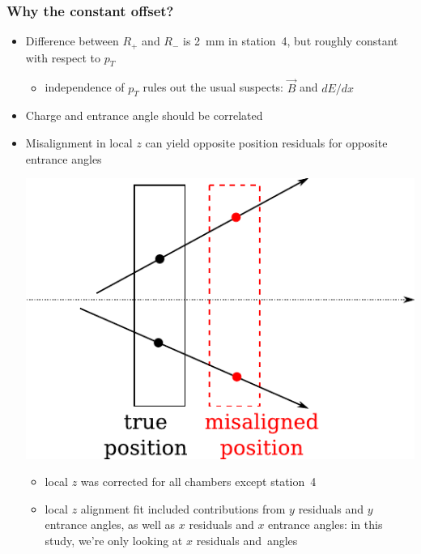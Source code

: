 \documentclass[compress]{beamer}
\begin{document}
\begin{frame}
\frametitle{Why the constant offset?}

\begin{itemize}
\item Difference between $R_+$ and $R_-$ is 2~mm in station~4, but
  roughly constant with respect to $p_T$
\begin{itemize}
\item independence of $p_T$ rules out the usual suspects: $\vec{B}$ and $dE/dx$
\end{itemize}
\item Charge and entrance angle should be correlated
\item Misalignment in local $z$ can yield opposite position residuals for opposite entrance angles

\begin{center}
\includegraphics[width=0.35\linewidth]{misalignment_in_z.pdf}
\end{center}

\begin{itemize}
\item local $z$ was corrected for all chambers except station~4
\item local $z$ alignment fit included contributions from $y$ residuals and $y$ entrance angles, as well as $x$ residuals and $x$ entrance angles: in this study, we're only looking at $x$ residuals \mbox{and angles\hspace{-1 cm}}
\end{itemize}
\end{itemize}
\end{frame}
\end{document}
